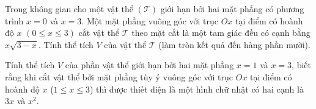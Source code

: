 \begin{bt}%
	Trong không gian cho một vật thể $\left(\mathscr{T}\right)$ giới hạn bởi hai mặt phẳng có phương trình $x=0$ và $x=3$. Một mặt phẳng  vuông góc với trục $Ox$ tại điểm có hoành độ $x$ $(0\leq x\leq 3)$ cắt vật thể $\mathscr{T}$ theo mặt cắt là một tam giác đều có cạnh bằng $x\sqrt{3-x}$. Tính thể tích $V$ của vật thể $\mathscr{T}$ (làm tròn kết quả đến hàng phần mười).
\end{bt}



\begin{bt}%
	Tính thể tích $V$ của phần vật thể giới hạn bởi hai mặt phẳng $x=1$ và $x=3$, biết rằng khi cắt vật thể bởi mặt phẳng tùy  ý vuông góc với trục $Ox$ tại điểm có hoành độ $x$ ($1 \le x \le 3$) thì được thiết diện là một hình chữ nhật có hai cạnh là $3x$ và $x^2$.
\end{bt}

